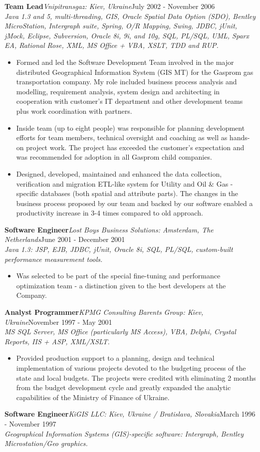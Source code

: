 \documentclass{res}
\newcommand{\jobdes}[4]{\needspace{3\baselineskip} %
{\noindent \bf #3\hspace{2ex}}{{\em \small #1}}{\hfill #2}\\{{\it \small #4.}}}
\begin{document}
\begin{resume}
\jobdes{Vnipitransgaz: Kiev, Ukraine}{July 2002 - November 2006}{Team Lead}
{Java 1.3 and 5, multi-threading, GIS, Oracle Spatial Data Option (SDO), Bentley MicroStation, Intergraph suite, Spring, O/R Mapping, Swing, JDBC, jUnit, jMock, Eclipse, Subversion, Oracle 8i, 9i, and 10g, SQL, PL/SQL, UML, Sparx EA, Rational Rose, XML, MS Office + VBA, XSLT, TDD and RUP}
\begin{itemize} \itemsep -2pt %
 \item Formed and led the Software Development Team involved in the major distributed Geographical Information System (GIS MT) for the Gasprom gas transportation company. My role included business process analysis and modelling, requirement analysis, system design and architecting in cooperation with customer’s IT department and other development teams plus work coordination with partners.
 \item Inside team (up to eight people) was responsible for planning development efforts for team members, technical oversight and coaching as well as hands-on project work. The project has exceeded the customer’s expectation and was recommended for adoption in all Gasprom child companies.
   \item Designed, developed, maintained and enhanced the data collection, verification and migration ETL-like system for Utility and Oil \& Gas - specific databases (both spatial and attribute parts). The changes in the business process proposed by our team and backed by our software enabled a productivity increase in 3-4 times compared to old approach.
\end{itemize}
\jobdes {Lost Boys Business Solutions: Amsterdam, The Netherlands}{June 2001 - December 2001}{Software Engineer}
{Java 1.3: JSP, EJB, JDBC, jUnit, Oracle 8i, SQL, PL/SQL, custom-built performance measurement tools}
\begin{itemize} \itemsep -2pt %
 \item Was selected to be part of the special fine-tuning and performance optimization team - a distinction given to the best developers at the Company.
\end{itemize}
\jobdes {KPMG Consulting Barents Group: Kiev, Ukraine}{November 1997 - May 2001}{Analyst Programmer}
{MS SQL Server, MS Office (particularly MS Access), VBA, Delphi, Crystal Reports, IIS + ASP, XML/XSLT}
\begin{itemize}
 \item Provided production support to a planning, design and technical implementation of various projects devoted to the budgeting process of the state and local budgets.  The projects were credited with eliminating 2 months from the budget development cycle and greatly expanded the analytic capabilities of the Ministry of Finance of Ukraine.
\end{itemize}
\jobdes {KiGIS LLC: Kiev, Ukraine / Bratislava, Slovakia}{March 1996 - November 1997}{Software Engineer}
{Geographical Information Systems (GIS)-specific software: Intergraph, Bentley Microstation/Geo graphics}


\end{resume}
\end{document}
